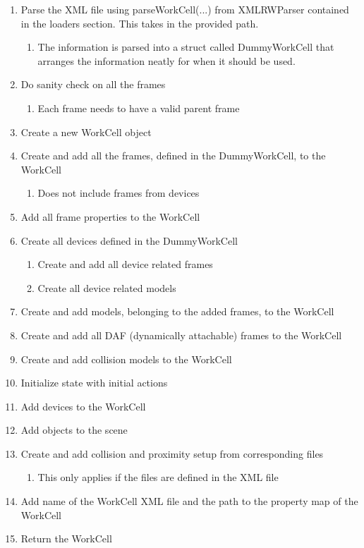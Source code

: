\begin{enumerate}
	\item Parse the XML file using parseWorkCell(...) from XMLRWParser contained in the loaders section. This takes in the provided path.
	\begin{enumerate}
		\item The information is parsed into a struct called DummyWorkCell that arranges the information neatly for when it should be used.
	\end{enumerate}
	\item Do sanity check on all the frames
	\begin{enumerate}
		\item Each frame needs to have a valid parent frame
	\end{enumerate}
	\item Create a new WorkCell object
	\item Create and add all the frames, defined in the DummyWorkCell, to the WorkCell
	\begin{enumerate}
		\item Does not include frames from devices
	\end{enumerate}
	\item Add all frame properties to the WorkCell
	\item Create all devices defined in the DummyWorkCell
	\begin{enumerate}
		\item Create and add all device related frames
		\item Create all device related models
	\end{enumerate}
	\item Create and add models, belonging to the added frames, to the WorkCell
	\item Create and add all DAF (dynamically attachable) frames to the WorkCell
	\item Create and add collision models to the WorkCell
	\item Initialize state with initial actions
	\item Add devices to the WorkCell
	\item Add objects to the scene
	\item Create and add collision and proximity setup from corresponding files
	\begin{enumerate}
		\item This only applies if the files are defined in the XML file
	\end{enumerate}
	\item Add name of the WorkCell XML file and the path to the property map of the WorkCell
	\item Return the WorkCell
\end{enumerate}

